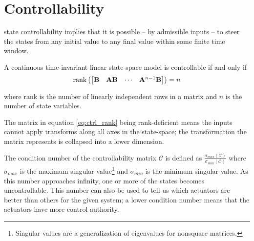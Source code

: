 \section{Controllability}

\Gls{state} controllability implies that it is possible -- by admissible inputs
-- to steer the \glspl{state} from any initial value to any final value within
some finite time window.
\begin{theorem}[Controllability]
  A continuous \gls{time-invariant} linear state-space \gls{model} is
  controllable if and only if
  \begin{equation}
    \operatorname{rank}\left(
    \begin{bmatrix}
      \mathbf{B} & \mathbf{A}\mathbf{B} & \cdots & \mathbf{A}^{n-1}\mathbf{B}
    \end{bmatrix}
    \right) = n
    \label{eq:ctrl_rank}
  \end{equation}

  where rank is the number of linearly independent rows in a matrix and $n$ is
  the number of \gls{state} variables.
\end{theorem}

The matrix in equation \eqref{eq:ctrl_rank} being rank-deficient means the
\glspl{input} cannot apply transforms along all axes in the state-space; the
transformation the matrix represents is collapsed into a lower dimension.

The condition number of the controllability matrix $\mathcal{C}$ is defined as
$\frac{\sigma_{max}(\mathcal{C})}{\sigma_{min}(\mathcal{C})}$ where
$\sigma_{max}$ is the maximum singular
value\footnote{\label{footn:singular_val}Singular values are a generalization of
eigenvalues for nonsquare matrices.} and $\sigma_{min}$ is the minimum singular
value. As this number approaches infinity, one or more of the \glspl{state}
becomes uncontrollable. This number can also be used to tell us which actuators
are better than others for the given \gls{system}; a lower condition number
means that the actuators have more control authority.
